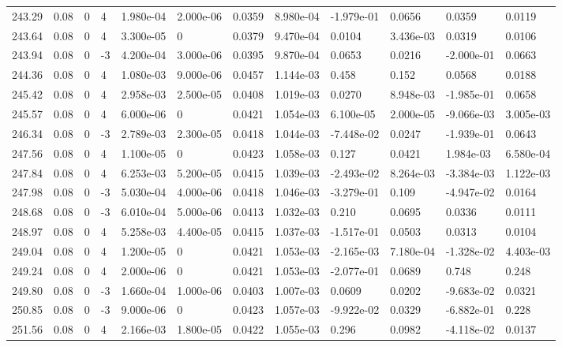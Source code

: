 \documentclass[preview]{standalone}
\begin{document}
{{{{{{{{{{{{\begin{tabular}{L{1.2cm}C{1.2cm} C{0.3cm}C{0.5cm} C{1.4cm}C{1.4cm} C{1.4cm}C{1.4cm} C{1.6cm}C{1.6cm} C{1.6cm}C{1.6cm}}
  243.29  &  0.08  & 0     &  4 &  1.980e-04  & 2.000e-06  &  0.0359&   8.980e-04& -1.979e-01 & 0.0656   &  0.0359 & 0.0119  \\ 
  243.64  &  0.08  & 0     &  4 &  3.300e-05  & 0  &  0.0379&   9.470e-04& 0.0104 & 3.436e-03   &  0.0319 & 0.0106  \\ 
  243.94  &  0.08  & 0     & -3 &  4.200e-04  & 3.000e-06  &  0.0395&   9.870e-04& 0.0653 & 0.0216   &  -2.000e-01 & 0.0663  \\ 
  244.36  &  0.08  & 0     &  4 &  1.080e-03  & 9.000e-06  &  0.0457&   1.144e-03& 0.458 & 0.152   &  0.0568 & 0.0188  \\ 
  245.42  &  0.08  & 0     &  4 &  2.958e-03  & 2.500e-05  &  0.0408&   1.019e-03& 0.0270 & 8.948e-03   &  -1.985e-01 & 0.0658  \\ 
  245.57  &  0.08  & 0     &  4 &  6.000e-06  & 0  &  0.0421&   1.054e-03& 6.100e-05 & 2.000e-05   &  -9.066e-03 & 3.005e-03  \\ 
  246.34  &  0.08  & 0     & -3 &  2.789e-03  & 2.300e-05  &  0.0418&   1.044e-03& -7.448e-02 & 0.0247   &  -1.939e-01 & 0.0643  \\ 
  247.56  &  0.08  & 0     &  4 &  1.100e-05  & 0  &  0.0423&   1.058e-03& 0.127 & 0.0421   &  1.984e-03 & 6.580e-04  \\ 
  247.84  &  0.08  & 0     &  4 &  6.253e-03  & 5.200e-05  &  0.0415&   1.039e-03& -2.493e-02 & 8.264e-03   &  -3.384e-03 & 1.122e-03  \\ 
  247.98  &  0.08  & 0     & -3 &  5.030e-04  & 4.000e-06  &  0.0418&   1.046e-03& -3.279e-01 & 0.109   &  -4.947e-02 & 0.0164  \\ 
  248.68  &  0.08  & 0     & -3 &  6.010e-04  & 5.000e-06  &  0.0413&   1.032e-03& 0.210 & 0.0695   &  0.0336 & 0.0111  \\ 
  248.97  &  0.08  & 0     &  4 &  5.258e-03  & 4.400e-05  &  0.0415&   1.037e-03& -1.517e-01 & 0.0503   &  0.0313 & 0.0104  \\ 
  249.04  &  0.08  & 0     &  4 &  1.200e-05  & 0  &  0.0421&   1.053e-03& -2.165e-03 & 7.180e-04   &  -1.328e-02 & 4.403e-03  \\ 
  249.24  &  0.08  & 0     &  4 &  2.000e-06  & 0  &  0.0421&   1.053e-03& -2.077e-01 & 0.0689   &  0.748 & 0.248  \\ 
  249.80  &  0.08  & 0     & -3 &  1.660e-04  & 1.000e-06  &  0.0403&   1.007e-03& 0.0609 & 0.0202   &  -9.683e-02 & 0.0321  \\ 
  250.85  &  0.08  & 0     & -3 &  9.000e-06  & 0  &  0.0423&   1.057e-03& -9.922e-02 & 0.0329   &  -6.882e-01 & 0.228  \\ 
  251.56  &  0.08  & 0     &  4 &  2.166e-03  & 1.800e-05  &  0.0422&   1.055e-03& 0.296 & 0.0982   &  -4.118e-02 & 0.0137  \\ 
\hline 
\end{tabular} 

}}}}}}}}}}}}
\end{document}
